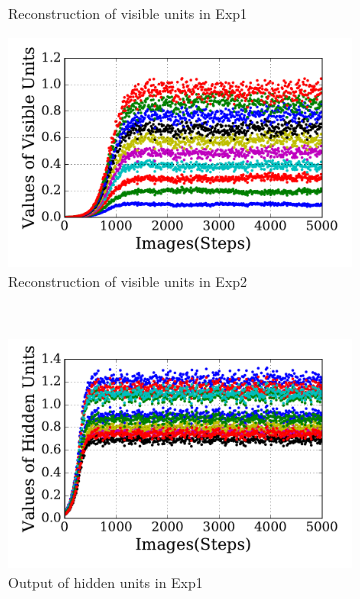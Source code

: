 \begin{figure}
\begin{subfigure}[t]{0.48\textwidth}
		\caption{Reconstruction of visible units in Exp1}
	\end{subfigure}
	\begin{subfigure}[t]{0.48\textwidth}
		\includegraphics[width=\textwidth]{pics_sdlm/21_exp_AE_noise/exp2_recon_s.pdf}
		\caption{Reconstruction of visible units in Exp2}
	\end{subfigure}\\
	\begin{subfigure}[t]{0.48\textwidth}
		\includegraphics[width=\textwidth]{pics_sdlm/21_exp_AE_noise/exp1_hid_s.pdf}
		\caption{Output of hidden units in Exp1}
	\end{subfigure}
	\begin{subfigure}[t]{0.48\textwidth}

\end{subfigure}
\end{figure}
